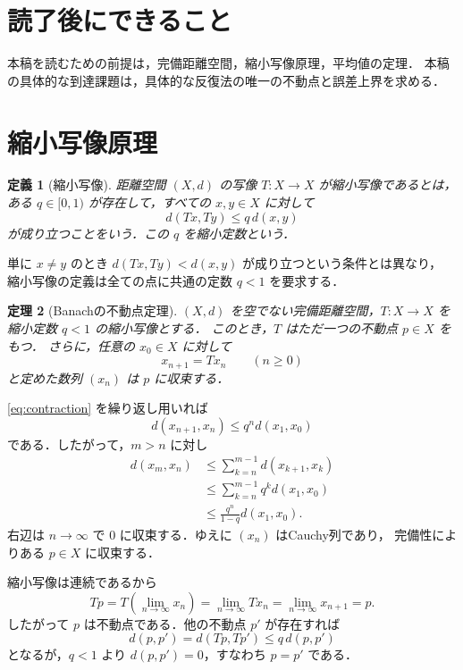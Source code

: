 \documentclass[a5paper,10pt,onecolumn]{jsarticle}
\makeatletter
\theoremstyle{mathnotetheorem}
\newtheorem{theorem}{定理}[section]
\newtheorem{definition}[theorem]{定義}
\renewcommand{\proofname}{証明}
\renewenvironment{proof}[1][\proofname]{%
  \par\pushQED{\qed}\normalfont\topsep4\p@\@plus2\p@\relax
  \trivlist\item[\hskip\labelsep\bfseries #1]\ignorespaces
}{\popQED\endtrivlist\@endpefalse}
\makeatother
\begin{document}
\section*{読了後にできること}
本稿を読むための前提は，完備距離空間，縮小写像原理，平均値の定理．
本稿の具体的な到達課題は，具体的な反復法の唯一の不動点と誤差上界を求める．

\section{縮小写像原理}

\begin{definition}[縮小写像]
距離空間 $(X,d)$ の写像 $T:X\to X$ が\emph{縮小写像}であるとは，
ある $q\in[0,1)$ が存在して，すべての $x,y\in X$ に対して
\begin{equation}\label{eq:contraction}
 d(Tx,Ty)\le q\,d(x,y)
\end{equation}
が成り立つことをいう．この $q$ を縮小定数という．
\end{definition}

単に $x\ne y$ のとき $d(Tx,Ty)<d(x,y)$ が成り立つという条件とは異なり，
縮小写像の定義は全ての点に共通の定数 $q<1$ を要求する．

\begin{theorem}[Banachの不動点定理]\label{thm:banach}
$(X,d)$ を空でない完備距離空間，$T:X\to X$ を縮小定数 $q<1$ の縮小写像とする．
このとき，$T$ はただ一つの不動点 $p\in X$ をもつ．
さらに，任意の $x_0\in X$ に対して
\[
 x_{n+1}=Tx_n\qquad(n\ge0)
\]
と定めた数列 $(x_n)$ は $p$ に収束する．
\end{theorem}

\begin{proof}
\eqref{eq:contraction} を繰り返し用いれば
\[
 d(x_{n+1},x_n)\le q^n d(x_1,x_0)
\]
である．したがって，$m>n$ に対し
\begin{align*}
 d(x_m,x_n)
 &\le\sum_{k=n}^{m-1}d(x_{k+1},x_k)\\
 &\le\sum_{k=n}^{m-1}q^k d(x_1,x_0)\\
 &\le\frac{q^n}{1-q}d(x_1,x_0).
\end{align*}
右辺は $n\to\infty$ で $0$ に収束する．ゆえに $(x_n)$ はCauchy列であり，
完備性によりある $p\in X$ に収束する．

縮小写像は連続であるから
\[
 Tp=T\!\left(\lim_{n\to\infty}x_n\right)
  =\lim_{n\to\infty}Tx_n
  =\lim_{n\to\infty}x_{n+1}=p.
\]
したがって $p$ は不動点である．他の不動点 $p'$ が存在すれば
\[
 d(p,p')=d(Tp,Tp')\le q\,d(p,p')
\]
となるが，$q<1$ より $d(p,p')=0$，すなわち $p=p'$ である．
\end{proof}
\end{document}
